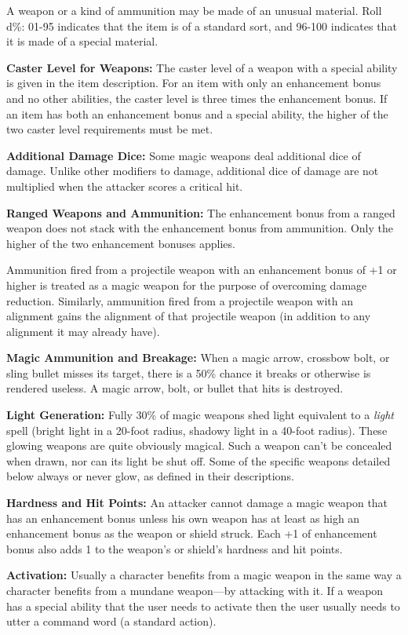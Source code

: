\documentclass{article}
\begin{document}
A weapon or a kind of ammunition may be made of an unusual material. Roll d\%: 
01-95 indicates that the item is of a standard sort, and 96-100 indicates that 
it is made of a special material.

\textbf{Caster Level for Weapons: }The caster level of a weapon with a special 
ability is given in the item description. For an item with only an enhancement 
bonus and no other abilities, the caster level is three times the enhancement bonus. 
If an item has both an enhancement bonus and a special ability, the higher of the 
two caster level requirements must be met.

\textbf{Additional Damage Dice:} Some magic weapons deal additional dice of damage. 
Unlike other modifiers to damage, additional dice of damage are not multiplied 
when the attacker scores a critical hit.

\textbf{Ranged Weapons and Ammunition:} The enhancement bonus from a ranged weapon 
does not stack with the enhancement bonus from ammunition. Only the higher of the 
two enhancement bonuses applies.

Ammunition fired from a projectile weapon with an enhancement bonus of +1 or higher 
is treated as a magic weapon for the purpose of overcoming damage reduction. Similarly, 
ammunition fired from a projectile weapon with an alignment gains the alignment 
of that projectile weapon (in addition to any alignment it may already have).

\textbf{Magic Ammunition and Breakage:} When a magic arrow, crossbow bolt, or sling 
bullet misses its target, there is a 50\% chance it breaks or otherwise is rendered 
useless. A magic arrow, bolt, or bullet that hits is destroyed.

\textbf{Light Generation:} Fully 30\% of magic weapons shed light equivalent to 
a \textit{light }spell (bright light in a 20-foot radius, shadowy light in a 40-foot 
radius). These glowing weapons are quite obviously magical. Such a weapon can't 
be concealed when drawn, nor can its light be shut off. Some of the specific weapons 
detailed below always or never glow, as defined in their descriptions.

\textbf{Hardness and Hit Points:} An attacker cannot damage a magic weapon that 
has an enhancement bonus unless his own weapon has at least as high an enhancement 
bonus as the weapon or shield struck. Each +1 of enhancement bonus also adds 1 
to the weapon's or shield's hardness and hit points.

\textbf{Activation:} Usually a character benefits from a magic weapon in the same 
way a character benefits from a mundane weapon---by attacking with it. If a weapon 
has a special ability that the user needs to activate then the user usually needs 
to utter a command word (a standard action).
\end{document}

